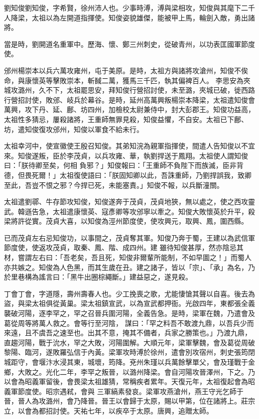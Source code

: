 
\begin{pinyinscope}

 劉知俊劉知俊，字希賢，徐州沛人也。少事時溥，溥與梁相攻，知俊與其麾下二千人降梁，太祖以為左開道指揮使。知俊姿貌雄傑，能被甲上馬，輪劍入敵，勇出諸將。



 當是時，劉開道名重軍中。歷海、懷、鄭三州刺史，從破青州，以功表匡國軍節度使。



 邠州楊崇本以兵六萬攻雍州，屯于美原。是時，太祖方與諸將攻滄州，知俊不俟命，與康懷英等擊敗崇本，斬馘二萬，獲馬三千匹，執其偏裨百人。
 李思安為夾城攻潞州，久不下，太祖罷思安，拜知俊行營招討使，未至潞，夾城已破，徙西路行營招討使，敗邠、岐兵於幕谷。是時，延州高萬興叛楊崇本降梁，太祖遣知俊會萬興，攻下丹、延、鄜、坊四州，加檢校太尉兼侍中，封大彭郡王。知俊功益高，太祖性多猜忌，屢殺諸將，王重師無罪見殺，知俊益懼，不自安。太祖已下鄜、坊，遣知俊復攻邠州，知俊以軍食不給未行。



 太祖幸河中，使宣徽使王殷召知俊。其弟知浣為親軍指揮使，間遣人告知俊以不宜來。知俊遂叛，臣於李茂貞，以兵攻雍、華，執劉捍送于鳳翔。太祖使人謂知俊曰：「朕待卿至矣，何相
 負邪？」知俊報曰：「王重師不負陛下而族滅，臣非背德，但畏死爾！」太祖復使語曰：「朕固知卿以此，吾誅重師，乃劉捍誤我，致卿至此，吾豈不恨之邪？今捍已死，未能塞責。」知俊不報，以兵斷潼關。



 太祖遣劉鄩、牛存節攻知俊，知俊遂奔于茂貞，茂貞地狹，無以處之，使之西攻靈武。韓遜告急，太祖遣康懷英、寇彥卿等攻邠寧以牽之。知俊大敗懷英於升平，殺梁將許從實。茂貞大喜，以知俊為涇州節度使，使攻興元，取興、鳳，圍西縣。



 已而茂貞左右忌知俊功，以事間之，茂貞奪其軍。知俊乃奔于蜀，王建以為武信軍節度使，使返攻茂貞，取秦、鳳、階、成四州。建
 雖待知俊甚厚，然亦陰忌其材，嘗謂左右曰：「吾老矣，吾且死，知俊非爾輩所能制，不如早圖之！」而蜀人亦共嫉之。知俊為人色黑，而其生歲在丑。建之諸子，皆以「宗」、「承」為名，乃於里巷構為謠言曰：「黑牛出圈棕繩斷。」建益惡之，遂見殺。



 丁會丁會，字道隱，壽州壽春人也。少工挽喪之歌，尤能悽愴其聲以自喜。後去為盜，與梁太祖俱從黃巢。梁太祖鎮宣武，以為宣武都押衙。光啟四年，東都張全義襲破河陽，逐李罕之，罕之召晉兵圍河陽，全義告急。是時，梁軍在魏，乃遣會及葛從周等將萬人救之。會等行至河陰，
 謀曰：「罕之料吾不敢渡九鼎，以吾兵少而來遠，且不虞吾之速至也。出其不意，掩其不備者，兵家之勝策也。」乃渡九鼎，直趨河陽，戰于沇水，罕之大敗，河陽圍解。大順元年，梁軍擊魏，會及葛從周破黎陽、臨河，遂敗羅弘信于內黃。梁軍攻時溥於徐州，遣會別攻宿州，刺史張筠閉城距守，會堰汴水浸其東，城壞，筠降。兗州朱瑾以兵萬餘擊單父，會及瑾戰于金鄉，大敗之。光化二年，李罕之叛晉，以潞州降梁。會自河陽攻晉澤州，下之。乃以會為昭義軍留後，會畏梁太祖雄猜，常稱疾者累年。天復元年，太祖復起會為昭義軍節度使。昭宗遇弒，會與
 三軍縞素發哀。梁軍攻燕滄州，燕王守光乞師于晉，晉人為攻潞州，會乃降晉。晉王以會歸于太原，賜以甲第，位在諸將上。莊宗立，以會為都招討使。天祐七年，以疾卒于太原。唐興，追贈太師。




\end{pinyinscope}
